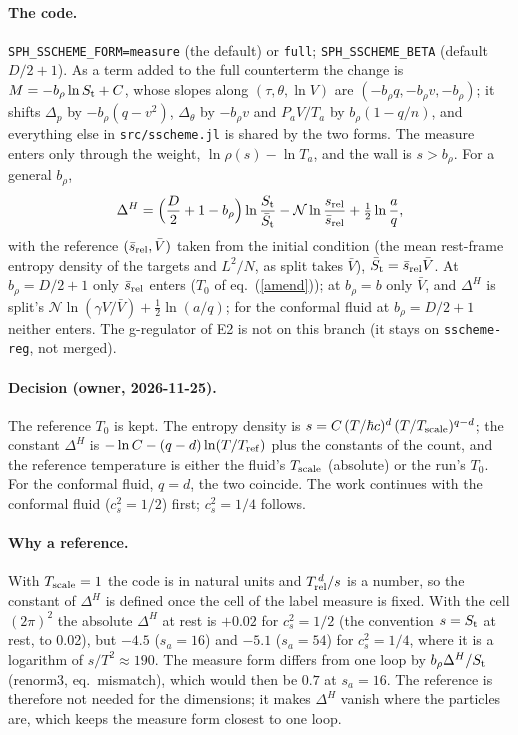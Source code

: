 \documentclass[11pt,aps,preprint,nofootinbib,superscriptaddress,tightenlines]{revtex4-2}
\def\st{\begin{equation}}
\def\stp{\end{equation}}
\def\Eq#1{eq.~(\ref{#1})}
\let\oldparagraph\paragraph
\renewcommand{\paragraph}{\par\bigskip\oldparagraph}
\begin{document}
\paragraph{The code.}  \texttt{SPH\_SSCHEME\_FORM=measure} (the default) or \texttt{full}; \texttt{SPH\_SSCHEME\_BETA} (default $D/2+1$).  As a term added
to the full counterterm the change is $M=-b_\rho\ln S_{\rm t}+C$, whose slopes along $(\tau,\theta,\ln V)$ are $(-b_\rho q,-b_\rho v,-b_\rho)$; it shifts
$\Delta_p$ by $-b_\rho(q-v^2)$, $\Delta_\theta$ by $-b_\rho v$ and $P_aV/T_a$ by $b_\rho(1-q/n)$, and everything else in \nolinkurl{src/sscheme.jl} is shared by
the two forms.  The measure enters only through the weight, $\ln\rho(s)-\ln T_a$, and the wall is $s>b_\rho$.  For a general $b_\rho$,
\st
\Delta^H=\Big(\frac D2+1-b_\rho\Big)\ln\frac{S_{\rm t}}{\bar S_{\rm t}}-\mathcal N\ln\frac{s_{\rm rel}}{\bar s_{\rm rel}}+\tfrac12\ln\frac aq ,
\stp
with the reference $(\bar s_{\rm rel},\bar V)$ taken from the initial condition (the mean rest-frame entropy density of the targets and $L^2/N$, as
split takes $\bar V$), $\bar S_{\rm t}=\bar s_{\rm rel}\bar V$.  At $b_\rho=D/2+1$ only $\bar s_{\rm rel}$ enters ($T_0$ of \Eq{amend}); at $b_\rho=b$ only
$\bar V$, and $\Delta^H$ is split's $\mathcal N\ln(\gamma V/\bar V)+\tfrac12\ln(a/q)$; for the conformal fluid at $b_\rho=D/2+1$ neither enters.  The
g-regulator of E2 is not on this branch (it stays on \texttt{sscheme-reg}, not merged).

\paragraph{Decision (owner, 2026-11-25).}  The reference $T_0$ is kept.  The entropy density is $s=C\,(T/\hbar c)^d\,(T/T_{\rm scale})^{q-d}$; the
constant $\Delta^H$ is $-\ln C-(q-d)\ln(T/T_{\rm ref})$ plus the constants of the count, and the reference temperature is either the fluid's
$T_{\rm scale}$ (absolute) or the run's $T_0$.  For the conformal fluid, $q=d$, the two coincide.  The work continues with the conformal fluid
($c_s^2=1/2$) first; $c_s^2=1/4$ follows.

\paragraph{Why a reference.}  With $T_{\rm scale}=1$ the code is in natural units and $T_{\rm rel}^{\,d}/s$ is a number, so the constant of
$\Delta^H$ is defined once the cell of the label measure is fixed.  With the cell $(2\pi)^2$ the absolute $\Delta^H$ at rest is $+0.02$ for
$c_s^2=1/2$ (the convention $s=S_{\rm t}$ at rest, to 0.02), but $-4.5$ ($s_a=16$) and $-5.1$ ($s_a=54$) for $c_s^2=1/4$, where it is a
logarithm of $s/T^2\approx190$.  The measure form differs from one loop by $b_\rho\Delta^H/S_{\rm t}$ (renorm3, eq.~mismatch), which would then
be $0.7$ at $s_a=16$.  The reference is therefore not needed for the dimensions; it makes $\Delta^H$ vanish where the particles are, which keeps
the measure form closest to one loop.
\end{document}
